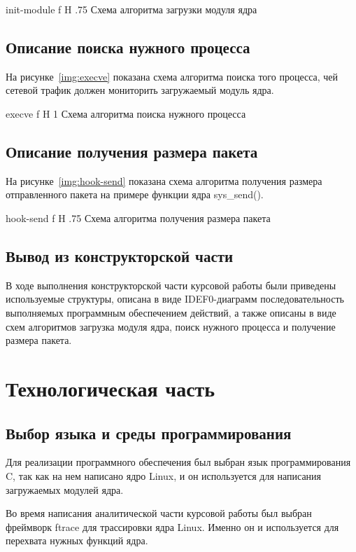 \documentclass{bmstu}
\begin{document}
    {init-module}
    {f}
    {H}
    {.75\textwidth}
    {Схема алгоритма загрузки модуля ядра}

\pagebreak 
\section{Описание поиска нужного процесса}

На рисунке~\ref{img:execve} показана схема алгоритма поиска того процесса, чей сетевой трафик должен мониторить загружаемый модуль ядра.

    {execve}
    {f}
    {H}
    {1\textwidth}
    {Схема алгоритма поиска нужного процесса}

\section{Описание получения размера пакета}

На рисунке~\ref{img:hook-send} показана схема алгоритма получения размера отправленного пакета на примере функции ядра sys\_send().

    {hook-send}
    {f}
    {H}
    {.75\textwidth}
    {Схема алгоритма получения размера пакета}

\section*{Вывод из конструкторской части}

В ходе выполнения конструкторской части курсовой работы были приведены используемые структуры, описана в виде IDEF0-диаграмм последовательность выполняемых программным обеспечением действий, а также описаны в виде схем алгоритмов загрузка модуля ядра, поиск нужного процесса и получение размера пакета.

\chapter{Технологическая часть}

\section{Выбор языка и среды программирования}

Для реализации программного обеспечения был выбран язык программирования C, так как на нем написано ядро Linux, и он используется для написания загружаемых модулей ядра.

Во время написания аналитической части курсовой работы был выбран фреймворк ftrace для трассировки ядра Linux. 
Именно он и используется для перехвата нужных функций ядра.
\end{document}
